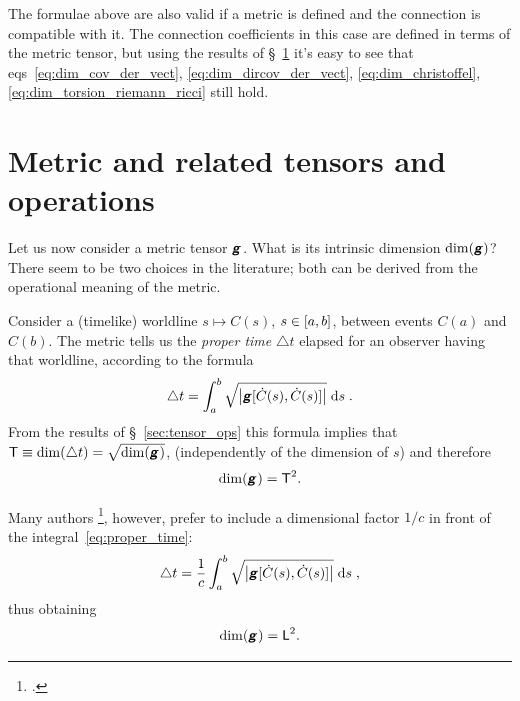 \documentclass[a4paper,12pt,onecolumn,oneside,article,british]{memoir}
\makeatletter
\newcommand*{\mathte}[1]{\textbf{\textit{\textsf{#1}}}}
\newcommand*{\citep}{\footcites}
\newcommand*{\di}{\mathrm{d}}%
\newcommand*{\incr}{\triangle}%
\DeclarePairedDelimiter\clcl{[}{]}
\DeclarePairedDelimiter\abs{\lvert}{\rvert}
\newcommand*{\sect}{\S}%
\newcommand*{\chap}{ch.}%
\newcommand*{\eqn}{eq.}%
\newcommand*{\eqns}{eqs}%
\newcommand*{\eg}{{e.g.}}
\newcommand*{\q}{}%
\DeclareRobustCommand*{\q}{%
  \mathbin{\mathpalette\bigcdot@{}}%
}
\newcommand*{\bigcdot@scalefactor}{0.7}
\newcommand*{\bigcdot@widthfactor}{1.5}
\newcommand*{\bigcdot@}[2]{%
  \sbox0{$#1\vcenter{}$}%
  \sbox2{$#1\cdot\m@th$}%
  \hbox to \bigcdot@widthfactor\wd2{%
    \hfil
    \raise\ht0\hbox{%
      \scalebox{\bigcdot@scalefactor}{%
        \lower\ht0\hbox{$#1\bullet\m@th$}%
      }%
    }%
    \hfil
  }%
}
\newcommand*{\Le}{\textsf{L}}
\newcommand*{\Ti}{\textsf{T}}
\newcommand*{\yg}{\mathte{g}}
\newcommand*{\ygc}{\mathte{g}}
\renewcommand*{\i}{\indices}
\newcommand*{\inct}{\incr t}
\makeatother
\begin{document}
\medskip

The formulae above are also valid if a metric is defined and the connection
is compatible with it. The connection coefficients in this case are defined
in terms of the metric tensor, but using the results of
\sect~\ref{sec:metric} it's easy to see that
\eqns~\eqref{eq:dim_cov_der_vect}, \eqref{eq:dim_dircov_der_vect},
\eqref{eq:dim_christoffel}, \eqref{eq:dim_torsion_riemann_ricci} still
hold.


\section{Metric and related tensors and operations}
\label{sec:metric}

Let us now consider a metric tensor $\yg\i{_{\q\q}}$. What is its intrinsic
dimension $\dim(\yg)$? There seem to be two choices in the literature; both
can be derived from the operational meaning of the metric.


Consider a (timelike) worldline $s \mapsto C(s)$, $s\in \clcl{a,b}$,
between events $C(a)$ and $C(b)$. The metric tells us the \emph{proper
  time} $\inct$ elapsed for an observer having that worldline, according to
the formula
\begin{equation}%
  \label{eq:proper_time}
\inct =  \int_a^b
\sqrt{\abs*{\yg[\dot{C}(s),\dot{C}(s)]}} \; \di s\;.
\end{equation}
From the results of \sect~\ref{sec:tensor_ops} this formula implies that
 $\Ti \equiv \dim(\inct) = \sqrt{\dim(\yg\i{_{\q\q}})}$,
(independently of the dimension of $s$) and therefore
\begin{equation}%
    \label{eq:dim_g}
    \dim(\yg\i{_{\q\q}}) = \Ti^{2}.
  \end{equation}

  Many authors \citep[\eg][\sect~V.62
  \eqn~(62.02)]{fock1955_t1964}[\chap~11
  \eqn~(11.21)]{curtisetal1985}[\sect~5.3
  \eqn~(5.6)]{rindler1969_r1986}[\chap~6 \eqn~(6.24)]{hartle2003}, however,
  prefer to include a dimensional factor $1/c$ in front of the
  integral~\eqref{eq:proper_time}:
\begin{equation}%
  \label{eq:proper_time_c}
  \inct = \frac{1}{c} \int_a^b
  \sqrt{\abs*{\ygc[\dot{C}(s),\dot{C}(s)]}} \;\di s\;,
\end{equation}
thus obtaining
\begin{equation}%
  \label{eq:dim_g_c}
  \dim(\ygc\i{_{\q\q}}) = \Le^{2}.
\end{equation}
\end{document}
